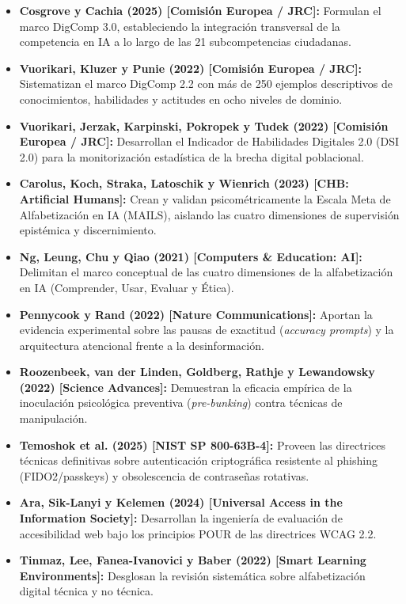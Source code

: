 \begin{itemize}
    \item \textbf{Cosgrove y Cachia (2025) [Comisión Europea / JRC]:} Formulan el marco DigComp 3.0, estableciendo la integración transversal de la competencia en IA a lo largo de las 21 subcompetencias ciudadanas.
    \item \textbf{Vuorikari, Kluzer y Punie (2022) [Comisión Europea / JRC]:} Sistematizan el marco DigComp 2.2 con más de 250 ejemplos descriptivos de conocimientos, habilidades y actitudes en ocho niveles de dominio.
    \item \textbf{Vuorikari, Jerzak, Karpinski, Pokropek y Tudek (2022) [Comisión Europea / JRC]:} Desarrollan el Indicador de Habilidades Digitales 2.0 (DSI 2.0) para la monitorización estadística de la brecha digital poblacional.
    \item \textbf{Carolus, Koch, Straka, Latoschik y Wienrich (2023) [CHB: Artificial Humans]:} Crean y validan psicométricamente la Escala Meta de Alfabetización en IA (MAILS), aislando las cuatro dimensiones de supervisión epistémica y discernimiento.
    \item \textbf{Ng, Leung, Chu y Qiao (2021) [Computers \& Education: AI]:} Delimitan el marco conceptual de las cuatro dimensiones de la alfabetización en IA (Comprender, Usar, Evaluar y Ética).
    \item \textbf{Pennycook y Rand (2022) [Nature Communications]:} Aportan la evidencia experimental sobre las pausas de exactitud (\textit{accuracy prompts}) y la arquitectura atencional frente a la desinformación.
    \item \textbf{Roozenbeek, van der Linden, Goldberg, Rathje y Lewandowsky (2022) [Science Advances]:} Demuestran la eficacia empírica de la inoculación psicológica preventiva (\textit{pre-bunking}) contra técnicas de manipulación.
    \item \textbf{Temoshok et al. (2025) [NIST SP 800-63B-4]:} Proveen las directrices técnicas definitivas sobre autenticación criptográfica resistente al phishing (FIDO2/passkeys) y obsolescencia de contraseñas rotativas.
    \item \textbf{Ara, Sik-Lanyi y Kelemen (2024) [Universal Access in the Information Society]:} Desarrollan la ingeniería de evaluación de accesibilidad web bajo los principios POUR de las directrices WCAG 2.2.
    \item \textbf{Tinmaz, Lee, Fanea-Ivanovici y Baber (2022) [Smart Learning Environments]:} Desglosan la revisión sistemática sobre alfabetización digital técnica y no técnica.

\end{itemize}
